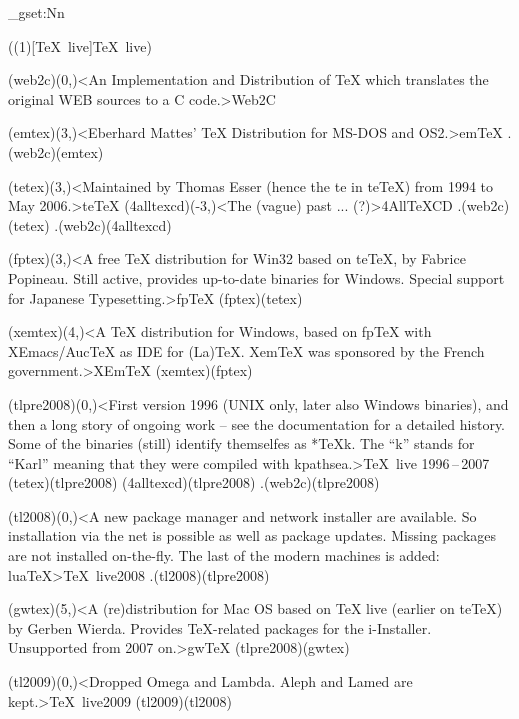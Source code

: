 \ExplSyntaxOn
\fp_gset:Nn
\ExplSyntaxOff

\tograph(\tostruct(1)[\TeX\ live]{\TeX\ live}){
	\tonode(web2c)(0,\layer)<An Implementation and Distribution of TeX which translates the original WEB sources to a C code.>{Web2C}
	\steplayer

	\tonode[\histdistro](emtex)(3,\layer)<Eberhard Mattes' TeX Distribution for MS-DOS and OS2.>{em\TeX}
	\todraw.(web2c)(emtex)
	\steplayer

	\tonode[\histdistro](tetex)(3,\layer)<Maintained by Thomas Esser (hence the te in teTeX) from 1994 to May 2006.>{te\TeX}
	\tonode[\histdistro](4alltexcd)(-3,\layer)<The (vague) past ... (?)>{4All\TeX CD }
	\todraw.(web2c)(tetex)
	\todraw.(web2c)(4alltexcd)
	\steplayer

	\tonode(fptex)(3,\layer)<A free TeX distribution for Win32 based on teTeX, by Fabrice Popineau. Still active, provides up-to-date binaries for Windows. Special support for Japanese Typesetting.>{fp\TeX}
	\todraw(fptex)(tetex)
	\steplayer[-2.5]

	\tonode[\histdistro](xemtex)(4,\layer)<A TeX distribution for Windows, based on fpTeX with XEmacs/AucTeX as IDE for (La)TeX. XemTeX was sponsored by the French government.>{XEm\TeX}
	\todraw(xemtex)(fptex)

	\tonode[\histdistro](tlpre2008)(0,\layer)<First version 1996 (UNIX only, later also Windows binaries), and then a long story of ongoing work – see the documentation for a detailed history. Some of the binaries (still) identify themselfes as *TeXk. The “k” stands for “Karl” meaning that they were compiled with kpathsea.>{\TeX\ live 1996\,–\,2007}
	\todraw(tetex)(tlpre2008)
	\todraw(4alltexcd)(tlpre2008)
	\todraw.(web2c)(tlpre2008)
	\steplayer

	\tonode(tl2008)(0,\layer)<A new package manager and network installer are available. So installation via the net is possible as well as package updates. Missing packages are not installed on-the-fly. The last of the modern machines is added: luaTeX>{\TeX\ live2008}
	\todraw.(tl2008)(tlpre2008)

	\tonode[\histdistro](gwtex)(5,\layer)<A (re)distribution for Mac OS based on TeX live (earlier on teTeX) by Gerben Wierda. Provides TeX-related packages for the i-Installer. Unsupported from 2007 on.>{gw\TeX}
	\todraw(tlpre2008)(gwtex)

	\steplayer

	\tonode(tl2009)(0,\layer)<Dropped Omega and Lambda. Aleph and Lamed are kept.>{\TeX\ live2009}
	\todraw(tl2009)(tl2008)
	\steplayer

}
